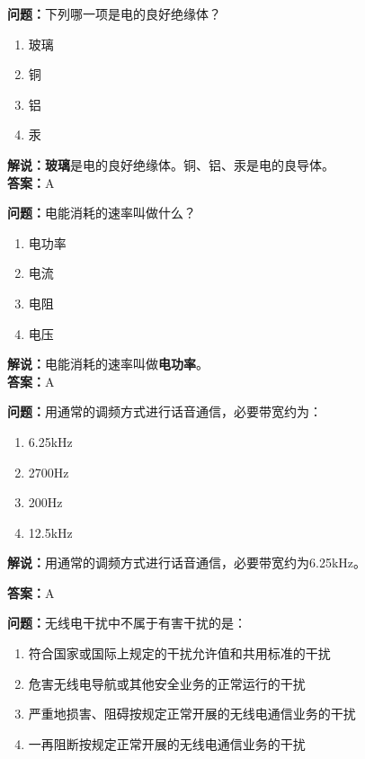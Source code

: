 \textbf{问题：}下列哪一项是电的良好绝缘体？

\begin{enumerate}[label=\Alph*), leftmargin=1cm]
	\item 玻璃
	\item 铜
	\item 铝
	\item 汞
\end{enumerate}

\textbf{解说：}\textbf{玻璃}是电的良好绝缘体。铜、铝、汞是电的良导体。\\\textbf{答案：}A



\textbf{问题：}电能消耗的速率叫做什么？

\begin{enumerate}[label=\Alph*), leftmargin=1cm]
	\item 电功率
	\item 电流
	\item 电阻
	\item 电压
\end{enumerate}

\textbf{解说：}电能消耗的速率叫做\textbf{电功率}。\\\textbf{答案：}A



\textbf{问题：}用通常的调频方式进行话音通信，必要带宽约为：

\begin{enumerate}[label=\Alph*), leftmargin=1cm]
	\item 6.25kHz
	\item 2700Hz
	\item 200Hz
	\item 12.5kHz
\end{enumerate}

\textbf{解说：}用通常的调频方式进行话音通信，必要带宽约为6.25kHz。%

\textbf{答案：}A

\textbf{问题：}无线电干扰中不属于有害干扰的是：

\begin{enumerate}[label=\Alph*), leftmargin=1cm]
	\item 符合国家或国际上规定的干扰允许值和共用标准的干扰
	\item 危害无线电导航或其他安全业务的正常运行的干扰
	\item 严重地损害、阻碍按规定正常开展的无线电通信业务的干扰
	\item 一再阻断按规定正常开展的无线电通信业务的干扰
\end{enumerate}

